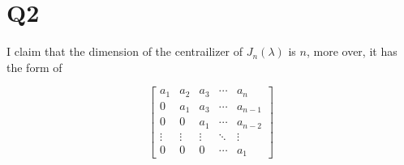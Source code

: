 \documentclass[12pt, a4paper]{article}
\theoremstyle{definition}
\theoremstyle{remark}
\begin{document}


\section{Q2}

I claim that the dimension of the centrailizer of $J_n(\lambda)$ is $n$, more over, it has the form of

$$
	\left[
		\begin{array}{cccccc}
			a_1    & a_2    & a_3    & \cdots & a_n     \\
			0      & a_1    & a_3    & \cdots & a_{n-1} \\
			0      & 0      & a_1    & \cdots & a_{n-2} \\
			\vdots & \vdots & \vdots & \ddots & \vdots  \\
			0      & 0      & 0      & \cdots & a_1
		\end{array}
		\right]
$$
\end{document}
